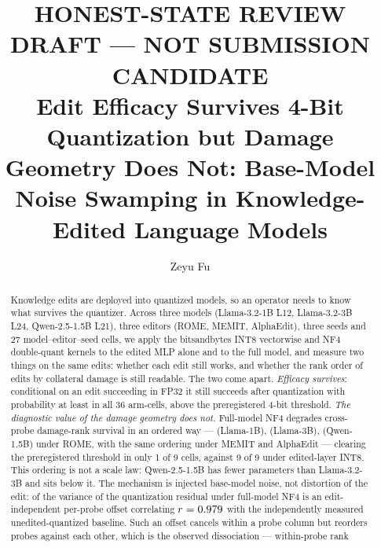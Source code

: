 \documentclass[preprint,12pt]{elsarticle}
\begin{document}
\begin{frontmatter}

\title{{\color{red}\bfseries HONEST-STATE REVIEW DRAFT --- NOT SUBMISSION CANDIDATE}\\[0.6em]
Edit Efficacy Survives 4-Bit Quantization but Damage Geometry Does Not:
Base-Model Noise Swamping in Knowledge-Edited Language Models}

\author{Zeyu Fu}

\begin{abstract}
Knowledge edits are deployed into quantized models, so an operator needs to know what
survives the quantizer. Across three models (Llama-3.2-1B L12, Llama-3.2-3B L24,
Qwen-2.5-1.5B L21), three editors (ROME, MEMIT, AlphaEdit), three seeds and 27
model--editor--seed cells, we apply the bitsandbytes INT8 vectorwise and NF4
double-quant kernels to the edited MLP alone and to the full model, and measure two
things on the same edits: whether each edit still works, and whether the rank order of
edits by collateral damage is still readable. The two come apart. \emph{Efficacy
survives}: conditional on an edit succeeding in FP32 it still succeeds after
quantization with probability at least \pMinCondAll{} in all 36 arm-cells, above the
preregistered \pEsrSurvFourThreshold{} 4-bit threshold. \emph{The diagnostic value of
the damage geometry does not.} Full-model NF4 degrades cross-probe damage-rank survival
in an ordered way --- \pFlatNfFMLOneRome{} (Llama-1B), \pFlatNfFMLThreeRome{}
(Llama-3B), \pFlatNfFMQOneRome{} (Qwen-1.5B) under ROME, with the same ordering under
MEMIT and AlphaEdit --- clearing the preregistered \pRankSurvFourThreshold{} threshold
in only 1 of 9 cells, against 9 of 9 under edited-layer INT8. This ordering is not a
scale law: Qwen-2.5-1.5B has fewer parameters than Llama-3.2-3B and sits below it. The
mechanism is injected base-model noise, not distortion of the edit: \pAddShareNfFM{} of
the variance of the quantization residual under full-model NF4 is an edit-independent
per-probe offset correlating $r=0.979{}$ with the independently measured
unedited-quantized baseline. Such an offset cancels within a probe column but reorders
probes against each other, which is the observed dissociation --- within-probe rank

\end{abstract}
\end{frontmatter}
\end{document}
